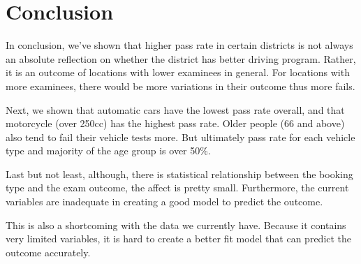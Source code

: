 \documentclass[11pt,a4paper,]{article}
\begin{document}
\section*{Conclusion}

In conclusion, we've shown that higher pass rate in certain districts is not always an absolute reflection on whether the district has better driving program. Rather, it is an outcome of locations with lower examinees in general. For locations with more examinees, there would be more variations in their outcome thus more fails.

Next, we shown that automatic cars have the lowest pass rate overall, and that motorcycle (over 250cc) has the highest pass rate. Older people (66 and above) also tend to fail their vehicle tests more. But ultimately pass rate for each vehicle type and majority of the age group is over 50\%.

Last but not least, although, there is statistical relationship between the booking type and the exam outcome, the affect is pretty small. Furthermore, the current variables are inadequate in creating a good model to predict the outcome.

This is also a shortcoming with the data we currently have. Because it contains very limited variables, it is hard to create a better fit model that can predict the outcome accurately.

\printbibliography
\end{document}
